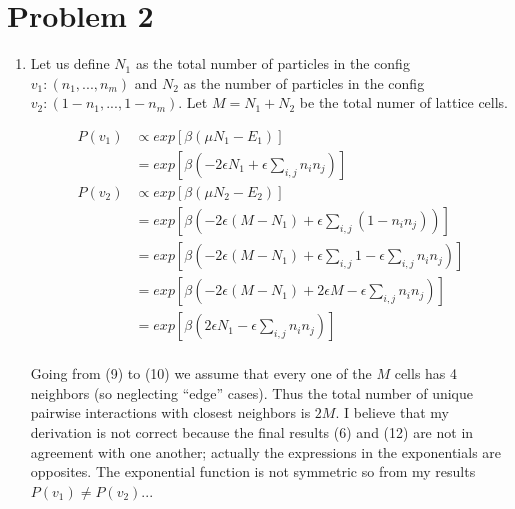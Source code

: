 \documentclass{article}
\begin{document}
\section*{Problem 2}
\begin{enumerate}
  \item Let us define $N_1$ as the total number of particles in the config $v_1: (n_1,...,n_m)$ and $N_2$ as the number of particles in the config $v_2: (1-n_1,...,1-n_m)$. Let $M = N_1 + N_2$ be the total numer of lattice cells.
    \begin{center}
      \begin{align}    
        P(v_1) &\propto exp \left[\beta (\mu N_1 - E_1) \right] \\
        &= exp \left[\beta (-2\epsilon N_1 + \epsilon \sum\limits_{i, j} n_in_j) \right] \\
        P(v_2) &\propto exp \left[\beta (\mu N_2 - E_2) \right] \\
        &= exp \left[\beta (-2\epsilon (M-N_1) + \epsilon \sum\limits_{i, j} (1-n_in_j)) \right] \\
        &= exp \left[\beta (-2\epsilon (M-N_1) + \epsilon \sum\limits_{i, j} 1 - \epsilon\sum\limits_{i, j} n_in_j) \right] \\
        &= exp \left[\beta (-2\epsilon (M-N_1) + 2\epsilon M - \epsilon\sum\limits_{i, j} n_in_j) \right] \\
        &= exp \left[\beta (2\epsilon N_1 - \epsilon \sum\limits_{i, j} n_in_j) \right] \\
      \end{align}
    \end{center}

    Going from (9) to (10) we assume that every one of the $M$ cells has 4 neighbors (so neglecting ``edge'' cases). Thus the total number of unique pairwise interactions with closest neighbors is $2M$. I believe that my derivation is not correct because the final results (6) and (12) are not in agreement with one another; actually the expressions in the exponentials are opposites. The exponential function is not symmetric so from my results $P(v_1) \neq P(v_2)$...


\end{enumerate}
\end{document}
